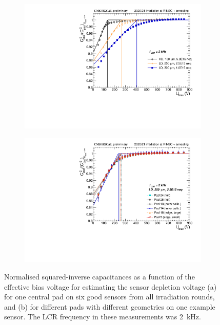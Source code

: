 \begin{figure}
	\captionsetup[subfigure]{aboveskip=-1pt,belowskip=-1pt}
	\centering
	\begin{subfigure}[b]{0.49\textwidth}
		\includegraphics[width=0.999\textwidth]{plots/channel_cv/channel_invCV_sensors_sensors.pdf}
		\subcaption{
		}
		\label{plot:pad_invCV_sensor}
	\end{subfigure}
	\hfill
	\begin{subfigure}[b]{0.49\textwidth}
		\includegraphics[width=0.999\textwidth]{plots/channel_cv/channel_invCV_sensors_channels.pdf}
		\subcaption{
		}
		\label{plot:pad_invCV_channels}
	\end{subfigure}
	\caption{
		Normalised squared-inverse capacitances as a function of the effective bias voltage for estimating the sensor depletion voltage (a) for one central pad on six good sensors from all irradiation rounds, and (b) for different pads with different geometries on one example sensor.
		The LCR frequency in these measurements was \SI{2}{\kilo\hertz}.
	}
\end{figure}



